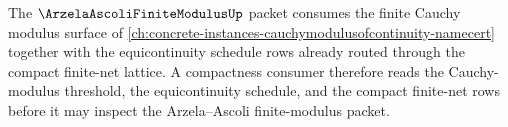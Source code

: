 The $\ArzelaAscoliFiniteModulusUp$ packet consumes the finite Cauchy modulus surface of \autoref{ch:concrete-instances-cauchymodulusofcontinuity-namecert} together with the equicontinuity schedule rows already routed through the compact finite-net lattice. A compactness consumer therefore reads the Cauchy-modulus threshold, the equicontinuity schedule, and the compact finite-net rows before it may inspect the Arzela--Ascoli finite-modulus packet.
